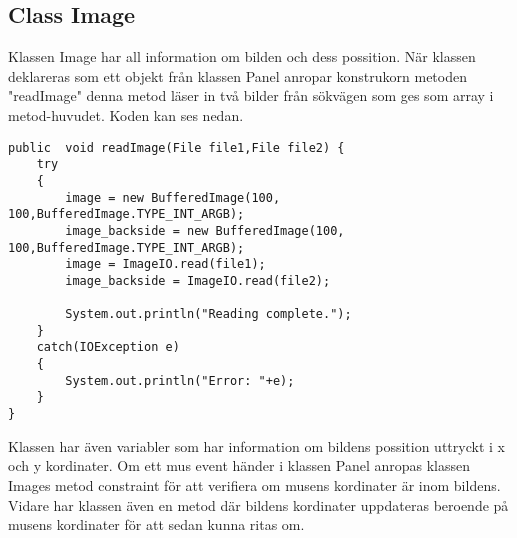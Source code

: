 \documentclass[hidelinks]{article}
\begin{document}
\subsection*{Class Image}
Klassen Image har all information om bilden och dess possition. När klassen deklareras som ett objekt från klassen Panel anropar konstrukorn metoden
"readImage" denna metod läser in två bilder från sökvägen som ges som array i metod-huvudet. Koden kan ses nedan.
\begin{verbatim}
public  void readImage(File file1,File file2) {
    try
    { 
        image = new BufferedImage(100, 100,BufferedImage.TYPE_INT_ARGB);
        image_backside = new BufferedImage(100, 100,BufferedImage.TYPE_INT_ARGB);
        image = ImageIO.read(file1); 
        image_backside = ImageIO.read(file2); 

        System.out.println("Reading complete."); 
    } 
    catch(IOException e) 
    { 
        System.out.println("Error: "+e); 
    } 
}
\end{verbatim}
Klassen har även variabler som har information om bildens possition uttryckt i x och y kordinater.
Om ett mus event händer i klassen Panel anropas klassen Images metod constraint för att verifiera om musens kordinater är inom bildens. Vidare har klassen även
en metod där bildens kordinater uppdateras beroende på musens kordinater för att sedan kunna ritas om.
\end{document}
